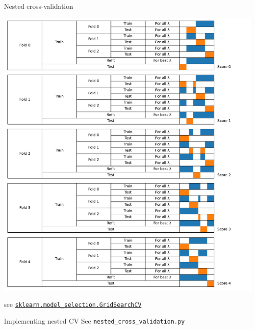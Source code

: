 \documentclass[presentation,mathserif,table]{beamer}
\begin{document}
\begin{frame}[label={sec:orgb15f93f},fragile]{Nested cross-validation}
 \begin{center}
\includegraphics[width=.9\linewidth]{cv_figure_nested.pdf}
\end{center}
see  \href{https://scikit-learn.org/stable/modules/generated/sklearn.model\_selection.GridSearchCV.html}{\texttt{sklearn.model\_selection.GridSearchCV}}
\end{frame}
\begin{frame}[label={sec:org5ebc55c},fragile]{Implementing nested CV}
 See \texttt{nested\_cross\_validation.py}
\end{frame}
\end{document}
